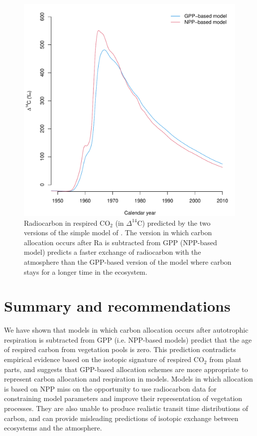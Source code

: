 \documentclass[12pt, a4paper]{article}
\begin{document}
\begin{figure}[htbp]
   \centering
   \includegraphics[scale=0.9]{radiocarbon.pdf} %
   \caption{Radiocarbon in respired CO$_2$ (in $\Delta^{14}$C) predicted by the two versions of the simple model of \citet{Emanuel1981}. The version in which carbon allocation occurs after Ra is subtracted from GPP (NPP-based model) predicts a faster exchange of radiocarbon with the atmosphere than the GPP-based version of the model where carbon stays for a longer time in the ecosystem.}
   \label{fig:radiocarbon}
\end{figure}

\section{Summary and recommendations}
We have shown that models in which carbon allocation occurs after autotrophic respiration is subtracted from GPP (i.e. NPP-based models) predict that the age of respired carbon from vegetation pools is zero. This prediction contradicts empirical evidence based on the isotopic signature of respired CO$_2$ from plant parts, and suggests that GPP-based allocation schemes are more appropriate to represent carbon allocation and respiration in models. Models in which allocation is based on NPP miss on the opportunity to use radiocarbon data for constraining model parameters and improve their representation of vegetation processes. They are also unable to produce realistic transit time distributions of carbon, and can provide misleading predictions of isotopic exchange between ecosystems and the atmosphere. 
\end{document}
